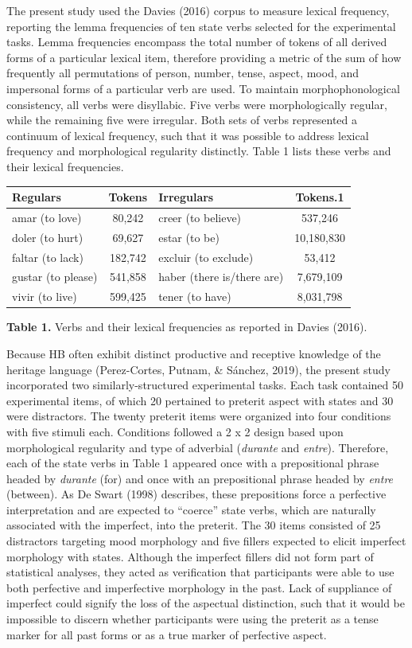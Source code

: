 \documentclass[
  english,
  man,floatsintext]{apa6}
\begin{document}
The present study used the Davies (2016) corpus to measure lexical frequency, reporting the lemma frequencies of ten state verbs selected for the experimental tasks. Lemma frequencies encompass the total number of tokens of all derived forms of a particular lexical item, therefore providing a metric of the sum of how frequently all permutations of person, number, tense, aspect, mood, and impersonal forms of a particular verb are used. To maintain morphophonological consistency, all verbs were disyllabic. Five verbs were morphologically regular, while the remaining five were irregular. Both sets of verbs represented a continuum of lexical frequency, such that it was possible to address lexical frequency and morphological regularity distinctly. Table 1 lists these verbs and their lexical frequencies.

\begin{tabular}{l|c|l|c}
\hline
Regulars & Tokens & Irregulars & Tokens.1\\
\hline
amar (to love) & 80,242 & creer (to believe) & 537,246\\
\hline
doler (to hurt) & 69,627 & estar (to be) & 10,180,830\\
\hline
faltar (to lack) & 182,742 & excluir (to exclude) & 53,412\\
\hline
gustar (to please) & 541,858 & haber (there is/there are) & 7,679,109\\
\hline
vivir (to live) & 599,425 & tener (to have) & 8,031,798\\
\hline
\end{tabular}

\textbf{Table 1.} Verbs and their lexical frequencies as reported in Davies (2016).

Because HB often exhibit distinct productive and receptive knowledge of the heritage language (Perez-Cortes, Putnam, \& Sánchez, 2019), the present study incorporated two similarly-structured experimental tasks. Each task contained 50 experimental items, of which 20 pertained to preterit aspect with states and 30 were distractors. The twenty preterit items were organized into four conditions with five stimuli each. Conditions followed a 2 x 2 design based upon morphological regularity and type of adverbial (\emph{durante} and \emph{entre}). Therefore, each of the state verbs in Table 1 appeared once with a prepositional phrase headed by \emph{durante} (for) and once with an prepositional phrase headed by \emph{entre} (between). As De Swart (1998) describes, these prepositions force a perfective interpretation and are expected to ``coerce'' state verbs, which are naturally associated with the imperfect, into the preterit. The 30 items consisted of 25 distractors targeting mood morphology and five fillers expected to elicit imperfect morphology with states. Although the imperfect fillers did not form part of statistical analyses, they acted as verification that participants were able to use both perfective and imperfective morphology in the past. Lack of suppliance of imperfect could signify the loss of the aspectual distinction, such that it would be impossible to discern whether participants were using the preterit as a tense marker for all past forms or as a true marker of perfective aspect.
\end{document}
